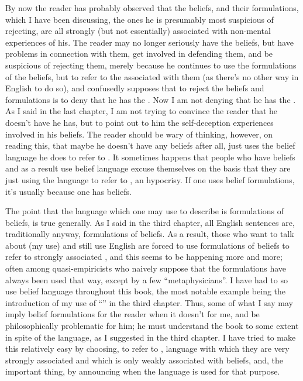 By now the reader has probably observed that the beliefs, and their formulations, which I have been discussing, the ones he is presumably most suspicious of rejecting, are all strongly (but not essentially) associated with non-mental experiences of his. The reader may no longer seriously have the beliefs, but have problems in connection with them, get involved in defending them, and be suspicious of rejecting them, merely because he continues to use the formulations of the beliefs, but to refer to the  associated with them (as there's no other way in English to do so), and confusedly supposes that to reject the beliefs and formulations is to deny that he has the . Now I am not denying that he has the . As I said in the last chapter, I am not trying to convince the reader that he doesn't have  he has, but to point out to him the self-deception experiences involved in his beliefs. The reader should be wary of thinking, however, on reading this, that maybe he doesn't have any beliefs after all, just uses the belief language he does to refer to . It sometimes happens that people who have beliefs and as a result use belief language excuse themselves on the basis that they are just using the language to refer to , an hypocrisy. If one uses belief formulations, it's usually because one has beliefs. 

The point that the language which one may use to describe is formulations of beliefs, is true generally. As I said in the third chapter, all English sentences are, traditionally anyway, formulations of beliefs. As a result, those who want to talk about  (my use) and still use English are forced to use formulations of beliefs to refer to strongly associated , and this seems to be happening more and more; often among quasi-empiricists who naively suppose that the formulations have always been used that way, except by a few \enquote{metaphysicians}. I have had to so use belief language throughout this book, the most notable example being the introduction of my use of \enquote{} in the third chapter. Thus, some of what I say may imply belief formulations for the reader when it doesn't for me, and be philosophically problematic for him; he must understand the book to some extent in spite of the language, as I suggested in the third chapter. I have tried to make this relatively easy by choosing, to refer to , language with which they are very strongly associated and which is only weakly associated with beliefs, and, the important thing, by announcing when the language is used for that purpose. 

